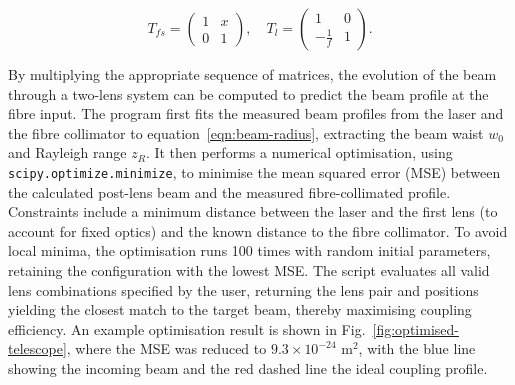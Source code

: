 \begin{equation}
    T_{fs} =
    \begin{pmatrix}
        1 & x \\
        0 & 1 
    \end{pmatrix}, \quad
    T_{l} =
    \begin{pmatrix}
        1 & 0 \\
        -\frac{1}{f} & 1 
    \end{pmatrix}.
    \label{eqn:beam-tm}
\end{equation}

By multiplying the appropriate sequence of matrices, the evolution of the beam through a two-lens system can be computed to predict the beam profile at the fibre input. The program first fits the measured beam profiles from the laser and the fibre collimator to equation~\ref{eqn:beam-radius}, extracting the beam waist $w_0$ and Rayleigh range $z_R$. It then performs a numerical optimisation, using \texttt{scipy.optimize.minimize}, to minimise the mean squared error (MSE) between the calculated post-lens beam and the measured fibre-collimated profile. Constraints include a minimum distance between the laser and the first lens (to account for fixed optics) and the known distance to the fibre collimator. To avoid local minima, the optimisation runs 100 times with random initial parameters, retaining the configuration with the lowest MSE. The script evaluates all valid lens combinations specified by the user, returning the lens pair and positions yielding the closest match to the target beam, thereby maximising coupling efficiency. An example optimisation result is shown in Fig.~\ref{fig:optimised-telescope}, where the MSE was reduced to $9.3\times10^{-24}$ m$^2$, with the blue line showing the incoming beam and the red dashed line the ideal coupling profile.


